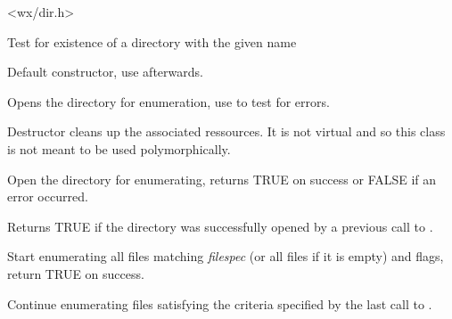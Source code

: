 
<wx/dir.h>


\label{wxdirexists}


Test for existence of a directory with the given name

\label{wxdirwxdir}


Default constructor, use  afterwards.


Opens the directory for enumeration, use  
to test for errors.

\label{wxdirdtor}


Destructor cleans up the associated ressources. It is not virtual and so this
class is not meant to be used polymorphically.

\label{wxdiropen}


Open the directory for enumerating, returns TRUE on success or FALSE if an
error occurred.

\label{wxdirisopened}


Returns TRUE if the directory was successfully opened by a previous call to 
.

\label{wxdirgetfirst}


Start enumerating all files matching {\it filespec} (or all files if it is
empty) and flags, return TRUE on success.

\label{wxdirgetnext}


Continue enumerating files satisfying the criteria specified by the last call
to .

